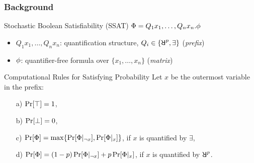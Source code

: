 \begin{frame}
    \frametitle{Background}
    \begin{block}{Stochastic Boolean Satisfiability (SSAT)}
        $\Phi=Q_1 x_1,\ldots,Q_n x_n.\phi$
        \pause
        \begin{itemize}
            \item $Q_1 x_1,\ldots,Q_n x_n$: quantification structure, $Q_i \in \{\random{p},\exists\}$ (\emph{prefix})
                  \pause
            \item $\phi$: quantifier-free formula over $\{x_1,\ldots,x_n\}$ (\emph{matrix})
        \end{itemize}
    \end{block}
    \pause
    \begin{block}{Computational Rules for Satisfying Probability}
        Let $x$ be the outermost variable in the prefix:
        \pause
        \begin{enumerate}
            \item[a)] $\Pr[\top]=1$,
                  \pause
            \item[b)] $\Pr[\bot]=0$,
                  \pause
            \item[c)] $\Pr[\Phi]=\max\{\Pr[\Phi|_{\lnot x}],\Pr[\Phi|_{x}]\}$, if $x$ is quantified by $\exists$,
                  \pause
            \item[d)] $\Pr[\Phi]=(1-p)\Pr[\Phi|_{\lnot x}]+p\Pr[\Phi|_{x}]$, if $x$ is quantified by $\random{p}$.
        \end{enumerate}
    \end{block}
\end{frame}

